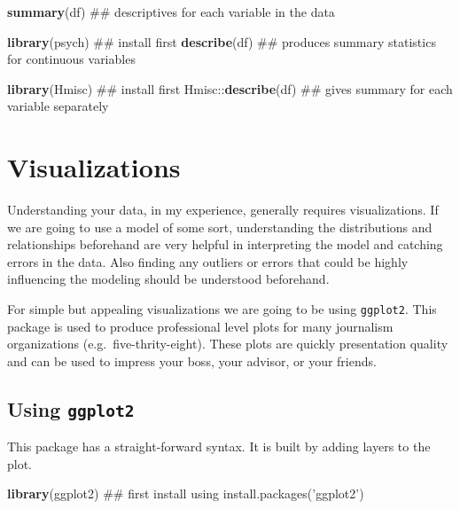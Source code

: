 \documentclass[]{tufte-book}
\newenvironment{Shaded}{}{}
\newcommand{\KeywordTok}[1]{\textcolor[rgb]{0.00,0.44,0.13}{\textbf{#1}}}
\newcommand{\OperatorTok}[1]{\textcolor[rgb]{0.40,0.40,0.40}{#1}}
\newcommand{\NormalTok}[1]{#1}
\theoremstyle{definition}
\theoremstyle{definition}
\theoremstyle{remark}
\begin{document}
\begin{Shaded}
\begin{Highlighting}[]
\KeywordTok{summary}\NormalTok{(df)  ## descriptives for each variable in the data}

\KeywordTok{library}\NormalTok{(psych)  ## install first}
\KeywordTok{describe}\NormalTok{(df)  ## produces summary statistics for continuous variables}

\KeywordTok{library}\NormalTok{(Hmisc)  ## install first}
\NormalTok{Hmisc}\OperatorTok{::}\KeywordTok{describe}\NormalTok{(df)  ## gives summary for each variable separately}
\end{Highlighting}
\end{Shaded}

\section*{Visualizations}\label{visualizations}

Understanding your data, in my experience, generally requires
visualizations. If we are going to use a model of some sort,
understanding the distributions and relationships beforehand are very
helpful in interpreting the model and catching errors in the data. Also
finding any outliers or errors that could be highly influencing the
modeling should be understood beforehand.

For simple but appealing visualizations we are going to be using
\texttt{ggplot2}. This package is used to produce professional level
plots for many journalism organizations (e.g.~five-thrity-eight). These
plots are quickly presentation quality and can be used to impress your
boss, your advisor, or your friends.

\subsection*{\texorpdfstring{Using
\texttt{ggplot2}}{Using ggplot2}}\label{using-ggplot2}

This package has a straight-forward syntax. It is built by adding layers
to the plot.

\begin{Shaded}
\begin{Highlighting}[]
\KeywordTok{library}\NormalTok{(ggplot2)  ## first install using install.packages('ggplot2')}
\end{Highlighting}
\end{Shaded}
\end{document}
